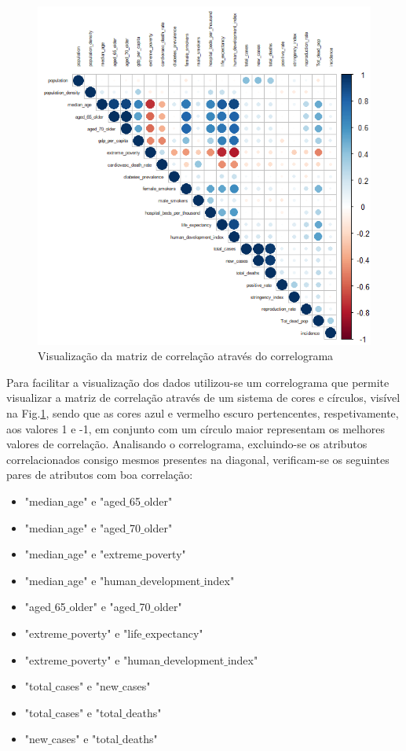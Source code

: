 \documentclass[conference]{IEEEtran}
\begin{document}
\begin{figure}[htbp]
\centerline{\includegraphics[width=0.95\columnwidth]{images/02_2.png}}
\caption{Visualização da matriz de correlação  através do correlograma}
\label{02_2}
\end{figure}
Para facilitar a visualização dos dados utilizou-se um correlograma que permite visualizar a matriz de correlação através de um sistema de cores e círculos, visível na Fig.\ref{02_2}, sendo que as cores azul e vermelho escuro pertencentes, respetivamente, aos valores 1 e -1, em conjunto com um círculo maior representam os melhores valores de correlação.
Analisando o correlograma, excluindo-se os atributos correlacionados consigo mesmos presentes na diagonal, verificam-se os seguintes pares de atributos com boa correlação:
\begin{itemize}
	\item "median$\_$age" e "aged$\_$65$\_$older"
	\item "median$\_$age" e "aged$\_$70$\_$older"
	\item "median$\_$age" e "extreme$\_$poverty"
	\item "median$\_$age" e "human$\_$development$\_$index"
	\item "aged$\_$65$\_$older" e "aged$\_$70$\_$older"
	\item "extreme$\_$poverty" e "life$\_$expectancy"
	\item "extreme$\_$poverty" e "human$\_$development$\_$index"
	\item "total$\_$cases" e "new$\_$cases"
	\item "total$\_$cases" e "total$\_$deaths"
	\item "new$\_$cases" e "total$\_$deaths"
\end{itemize}
\end{document}
